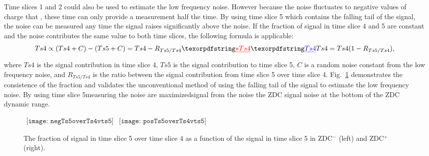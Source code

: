       Time slices 1 and 2 could also be used to estimate the low frequency 
        noise.
      However because the noise fluctuates to negative values of charge that 
        \DIFdelbegin {}\DIFdelend \DIFaddbegin {}\DIFaddend , these time \DIFdelbegin {}\DIFdelend \DIFaddbegin {}\DIFaddend can only provide a 
        measurement \DIFaddbegin {}\DIFaddend half the time. 
      By using time slice 5 which contains the falling tail of the signal, 
        the noise can be measured any time the signal raises significantly 
        above the noise.
      If the fraction of signal in time slice 4 and 5 are constant and
        the noise contributes the same value to both time slices, the 
        following formula is applicable:
      \begin{equation}
        Ts4 \propto (Ts4 + C) - ( Ts5 + C ) = Ts4 - R_{Ts5/Ts4}\DIFdelbegin \DIFdel{*Ts4 
        }\DIFdelend \DIFaddbegin \DIFadd{Ts4 
        }\DIFaddend = Ts4(1-R_{Ts5/Ts4}),
        \label{eq:ts4ish}
      \end{equation}
      where $Ts4$ is the signal contribution in time slice 4, $Ts5$ is the 
        signal contribution to time slice 5, $C$ is a random noise constant
        from the low frequency noise, and $R_{Ts5/Ts4}$ is the ratio between
        the signal contribution from time slice 5 over time slice 4.
      Fig.~\ref{fig:zdcTs4OvTs5VTs5} demonstrates the consistence of the 
        fraction and validates the unconventional method of using the falling 
        tail of the signal to estimate the low frequency noise. 
      By using time slice 5\DIFdelbegin {}\DIFdelend \DIFaddbegin {}\DIFaddend measuring the noise are maximized\DIFdelbegin {}\DIFdelend \DIFaddbegin {}\DIFaddend signal from the noise \DIFdelbegin {}\DIFdelend \DIFaddbegin {}\DIFaddend the ZDC signal \DIFdelbegin {}\DIFdelend \DIFaddbegin {}\DIFaddend noise at the 
        bottom of the ZDC dynamic range.
      \begin{figure}[!Hhbt]
        \centering
        $ \begin{array}{cc}
          \texttt{[image: negTs5overTs4vts5]} &
          \texttt{[image: posTs5overTs4vts5]}
        \end{array} $  
        \caption{ The fraction of signal in time slice 5 over time slice 4 
          as a function of the signal in time slice 5 in ZDC$^{-}$ (left) and 
          ZDC$^{+}$ (right).}
        \label{fig:zdcTs4OvTs5VTs5}
      \end{figure}

